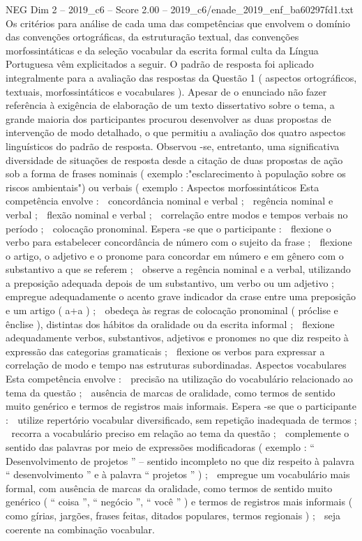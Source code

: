 \begin{textsample}{NEG Dim 2 – 2019\_c6 – Score 2.00 – 2019\_c6/enade\_2019\_enf\_ba60297fd1.txt}
Os critérios para análise de cada uma das competências que envolvem o domínio das convenções ortográficas, da estruturação textual, das convenções morfossintáticas e da seleção vocabular da escrita formal culta da Língua Portuguesa vêm explicitados a seguir.
O padrão de resposta foi aplicado integralmente para a avaliação das respostas da Questão 1 ( aspectos ortográficos, textuais, morfossintáticos e vocabulares ).
Apesar de o enunciado não fazer referência à exigência de elaboração de um texto dissertativo sobre o tema, a grande maioria dos participantes procurou desenvolver as duas propostas de intervenção de modo detalhado, o que permitiu a avaliação dos quatro aspectos linguísticos do padrão de resposta.
Observou -se, entretanto, uma significativa diversidade de situações de resposta desde a citação de duas propostas de ação sob a forma de frases nominais ( exemplo :"esclarecimento à população sobre os riscos ambientais") ou verbais ( exemplo : Aspectos morfossintáticos Esta competência envolve :  concordância nominal e verbal ;  regência nominal e verbal ;  flexão nominal e verbal ;  correlação entre modos e tempos verbais no período ;  colocação pronominal.
Espera -se que o participante :  flexione o verbo para estabelecer concordância de número com o sujeito da frase ;  flexione o artigo, o adjetivo e o pronome para concordar em número e em gênero com o substantivo a que se referem ;  observe a regência nominal e a verbal, utilizando a preposição adequada depois de um substantivo, um verbo ou um adjetivo ;  empregue adequadamente o acento grave indicador da crase entre uma preposição e um artigo ( a+a ) ;  obedeça às regras de colocação pronominal ( próclise e ênclise ), distintas dos hábitos da oralidade ou da escrita informal ;  flexione adequadamente verbos, substantivos, adjetivos e pronomes no que diz respeito à expressão das categorias gramaticais ;  flexione os verbos para expressar a correlação de modo e tempo nas estruturas subordinadas.
Aspectos vocabulares Esta competência envolve :  precisão na utilização do vocabulário relacionado ao tema da questão ;  ausência de marcas de oralidade, como termos de sentido muito genérico e termos de registros mais informais.
Espera -se que o participante :  utilize repertório vocabular diversificado, sem repetição inadequada de termos ;  recorra a vocabulário preciso em relação ao tema da questão ;  complemente o sentido das palavras por meio de expressões modificadoras ( exemplo : “ Desenvolvimento de projetos ” – sentido incompleto no que diz respeito à palavra “ desenvolvimento ” e à palavra “ projetos ” ) ;  empregue um vocabulário mais formal, com ausência de marcas da oralidade, como termos de sentido muito genérico ( “ coisa ”, “ negócio ”, “ você ” ) e termos de registros mais informais ( como gírias, jargões, frases feitas, ditados populares, termos regionais ) ;  seja coerente na combinação vocabular.

\end{textsample}
